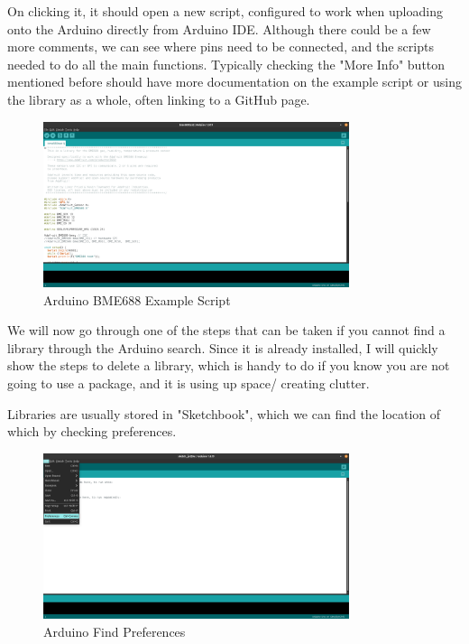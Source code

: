 \documentclass[a4paper,11pt]{report}
\begin{document}
On clicking it, it should open a new script, configured to work when uploading onto the Arduino directly from Arduino IDE. Although there could be a few more comments, we can see where pins need to be connected, and the scripts needed to do all the main functions. Typically checking the "More Info" button mentioned before should have more documentation on the example script or using the library as a whole, often linking to a GitHub page.

\begin{figure}[H]
\centering
\includegraphics[width=0.8\textwidth]{screenshots/arduinobme688examplescript}
\caption{Arduino BME688 Example Script}
\end{figure}

We will now go through one of the steps that can be taken if you cannot find a library through the Arduino search. Since it is already installed, I will quickly show the steps to delete a library, which is handy to do if you know you are not going to use a package, and it is using up space/ creating clutter.

Libraries are usually stored in "Sketchbook", which we can find the location of which by checking preferences.

\begin{figure}[H]
\centering
\includegraphics[width=0.8\textwidth]{screenshots/arduinopreferences}
\caption{Arduino Find Preferences}
\end{figure}
\end{document}
